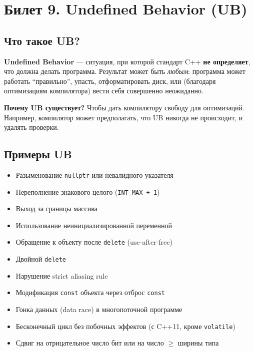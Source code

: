 \documentclass[12pt,a4paper]{article}
\begin{document}
\section{Билет 9. Undefined Behavior (UB)}

\subsection{Что такое UB?}

\textbf{Undefined Behavior} --- ситуация, при которой стандарт C++ \textbf{не определяет}, что должна делать программа. Результат может быть \textit{любым}: программа может работать ``правильно'', упасть, отформатировать диск, или (благодаря оптимизациям компилятора) вести себя совершенно неожиданно.

\textbf{Почему UB существует?} Чтобы дать компилятору свободу для оптимизаций. Например, компилятор может предполагать, что UB никогда не происходит, и удалять проверки.

\subsection{Примеры UB}

\begin{itemize}
    \item Разыменование \texttt{nullptr} или невалидного указателя
    \item Переполнение знакового целого (\texttt{INT\_MAX + 1})
    \item Выход за границы массива
    \item Использование неинициализированной переменной
    \item Обращение к объекту после \texttt{delete} (use-after-free)
    \item Двойной \texttt{delete}
    \item Нарушение strict aliasing rule
    \item Модификация \texttt{const} объекта через отброс \texttt{const}
    \item Гонка данных (data race) в многопоточной программе
    \item Бесконечный цикл без побочных эффектов (с C++11, кроме \texttt{volatile})
    \item Сдвиг на отрицательное число бит или на число $\ge$ ширины типа
\end{itemize}
\end{document}
